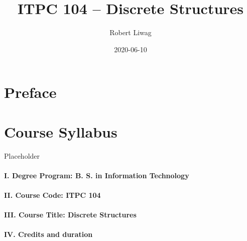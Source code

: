 \documentclass[]{book}
\title{ITPC 104 -- Discrete Structures}
\author{Robert Liwag}
\date{2020-06-10}
\theoremstyle{definition}
\theoremstyle{definition}
\theoremstyle{definition}
\theoremstyle{remark}
\begin{document}
\maketitle

{
\setcounter{tocdepth}{1}
\tableofcontents
}
\hypertarget{preface}{%
\chapter*{Preface}\label{preface}}

\hypertarget{course-syllabus}{%
\chapter*{Course Syllabus}\label{course-syllabus}}

Placeholder

\hypertarget{i.-degree-program-b.-s.-in-information-technology}{%
\subsubsection*{I. Degree Program: B. S. in Information Technology}\label{i.-degree-program-b.-s.-in-information-technology}}

\hypertarget{ii.-course-code-itpc-104}{%
\subsubsection*{II. Course Code: ITPC 104}\label{ii.-course-code-itpc-104}}

\hypertarget{iii.-course-title-discrete-structures}{%
\subsubsection*{III. Course Title: Discrete Structures}\label{iii.-course-title-discrete-structures}}

\hypertarget{iv.-credits-and-duration}{%
\subsubsection*{IV. Credits and duration}\label{iv.-credits-and-duration}}
\end{document}
